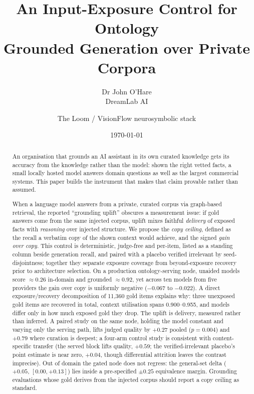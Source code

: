 \documentclass[10pt,twocolumn]{article}
\title{\vspace{-1.2cm}\bfseries An Input-Exposure Control for Ontology\\
Grounded Generation over Private Corpora}
\author{Dr John O'Hare\\ \small DreamLab AI \and \small The Loom / VisionFlow neurosymbolic stack}
\date{\today}
\begin{document}
\maketitle

\begin{abstract}
\noindent
An organisation that grounds an AI assistant in its own curated knowledge gets its accuracy from the knowledge rather than the model: shown the right vetted facts, a small locally hosted model answers domain questions as well as the largest commercial systems. This paper builds the instrument that makes that claim provable rather than assumed.

When a language model answers from a private, curated corpus via graph-based retrieval, the reported ``grounding uplift'' obscures a measurement issue: if gold answers come from the same injected corpus, uplift mixes faithful \emph{delivery} of exposed facts with \emph{reasoning} over injected structure. We propose the \emph{copy ceiling}, defined as the recall a verbatim copy of the shown context would achieve, and the signed \emph{gain over copy}. This control is deterministic, judge-free and per-item, listed as a standing column beside generation recall, and paired with a placebo verified irrelevant by seed-disjointness; together they separate exposure coverage from beyond-exposure recovery prior to architecture selection. On a production ontology-serving node, unaided models score $\approx0.26$ in-domain and grounded $\approx0.92$, yet across ten models from five providers the gain over copy is uniformly negative ($-0.067$ to $-0.022$). A direct exposure/recovery decomposition of 11{,}360 gold items explains why: three unexposed gold items are recovered in total, context utilisation spans 0.900--0.955, and models differ only in how much exposed gold they drop. The uplift is delivery, measured rather than inferred. A paired study on the same node, holding the model constant and varying only the serving path, lifts judged quality by $+0.27$ pooled ($p=0.004$) and $+0.79$ where curation is deepest; a four-arm control study is consistent with content-specific transfer (the served block lifts quality, $+0.59$; the verified-irrelevant placebo's point estimate is near zero, $+0.04$, though differential attrition leaves the contrast imprecise). Out of domain the gated node does not regress: the general-set delta ($+0.05$, $[0.00,+0.13]$) lies inside a pre-specified $\pm0.25$ equivalence margin. Grounding evaluations whose gold derives from the injected corpus should report a copy ceiling as standard.
\end{abstract}
\end{document}
